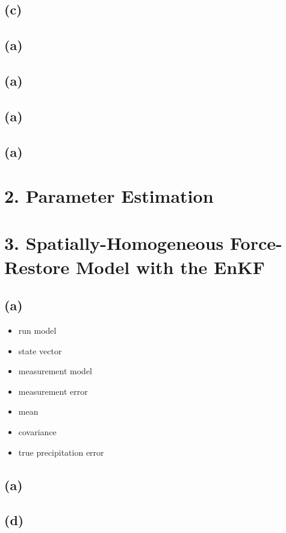 \documentclass[letterpaper]{tufte-handout}
\begin{document}
\subsection{(c)}
\subsection{(a)}
\subsection{(a)}
\subsection{(a)}
\subsection{(a)}
\section{2. Parameter Estimation}
\section{3. Spatially-Homogeneous Force-Restore Model with the EnKF}
\subsection{(a)}
\begin{itemize}
  \item run model
  \item state vector
  \item measurement model
  \item measurement error
  \item mean
  \item covariance 
  \item true precipitation error
\end{itemize}
\subsection{(a)}
\subsection{(d)}
\end{document}
